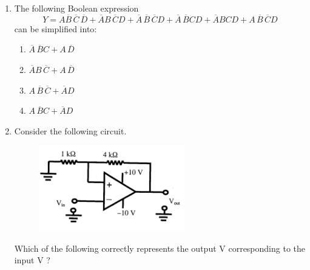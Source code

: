 \documentclass[journal,12pt,onecolumn]{IEEEtran}
\begin{document}
\begin{enumerate}
\item The following Boolean expression 
\[
Y = A\overline{B} \, \overline{C} \, \overline{D} 
+ \overline{A}B \, \overline{C} D
+ \overline{A} \, \overline{B} \, \overline{C} D
+ \overline{A} \, \overline{B} C D
+ \overline{A} B C D
+ A \, \overline{B} \, \overline{C} D
\]
can be simplified into:


\hfill{}


\begin{multicols}{2}
\begin{enumerate}
    \item $\overline{A} \, \overline{B} C + A \, \overline{D}$
    \item $\overline{A} B \, \overline{C} + A \, \overline{D}$
    \item $A \, \overline{B} \, \overline{C} + \overline{A} D$
    \item $A \, \overline{B} C + \overline{A} D$
\end{enumerate}
\end{multicols}

\item Consider the following circuit.

\begin{figure}[ht!]
    \centering
    \includegraphics[width=0.6\textwidth]{fig7.jpeg}
    \caption{}
    \label{fig:fig7.jpeg}
\end{figure}

Which of the following correctly represents the output V corresponding to the input V ?

\hfill{}


\end{enumerate}
\end{document}
